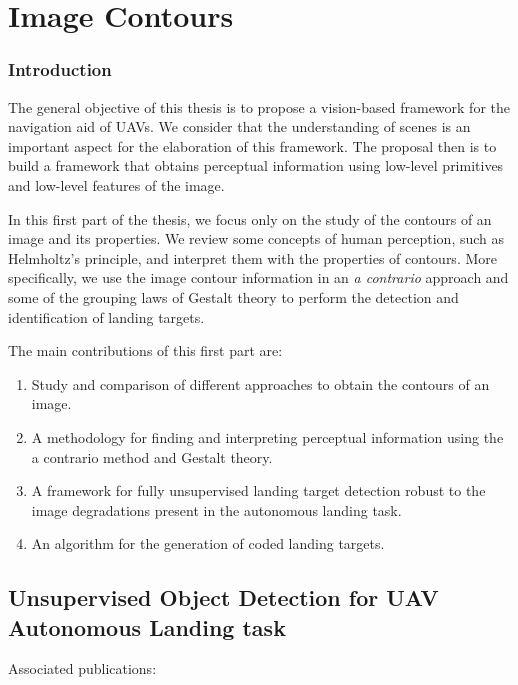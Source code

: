 \part{Image Contours}\label{part:image_contours}

\section*{Introduction}
The general objective of this thesis is to propose a vision-based framework for the navigation aid of UAVs. We consider that the understanding of scenes is an important aspect for the elaboration of this framework. The proposal then is to build a framework that obtains perceptual information using low-level primitives and low-level features of the image. 

In this first part of the thesis, we focus only on the study of the contours of an image and its properties. We review some concepts of human perception, such as Helmholtz's principle, and interpret them with the properties of contours. More specifically, we use the image contour information in an \textit{a contrario} approach and some of the grouping laws of Gestalt theory to perform the detection and identification of landing targets.

The main contributions of this first part are:

\begin{enumerate}
	\item Study and comparison of different approaches to obtain the contours of an image.
	\item A methodology for finding and interpreting perceptual information using the a contrario method and Gestalt theory.
	\item A framework for fully unsupervised landing target detection robust to the image degradations present in the autonomous landing task.
	\item An algorithm for the generation of coded landing targets.
\end{enumerate}


\chapter{Unsupervised Object Detection for UAV Autonomous Landing task} \label{ch:landing_target_detection}

Associated publications: \vspace{-2mm}

